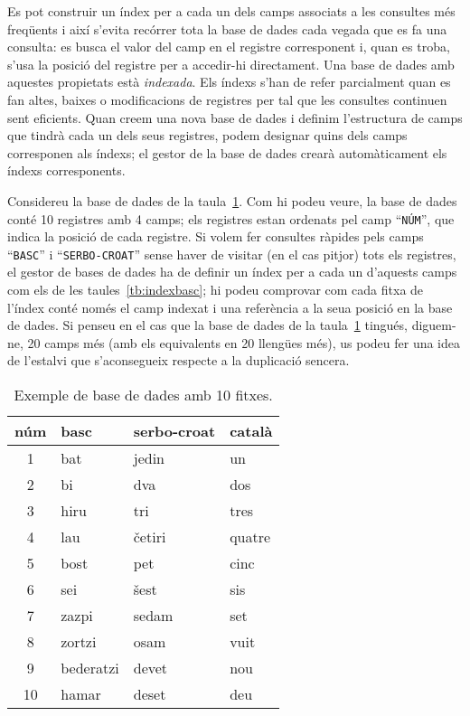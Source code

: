 Es pot construir un índex per a cada un dels camps associats a les
consultes més freqüents i així s'evita recórrer tota la base de dades
cada vegada que es fa una consulta: es busca el valor del camp en el
registre corresponent i, quan es troba, s'usa la posició del registre
per a accedir-hi directament. Una base de dades amb aquestes
propietats està \emph{indexada}. 
Els índexs s'han de
refer parcialment quan es fan altes, baixes o modificacions de registres per tal que les
consultes continuen sent eficients. Quan creem una nova base de dades i definim
l'estructura de camps que tindrà cada un dels seus registres, podem
designar quins dels camps corresponen als índexs; el gestor de la base
de dades crearà automàticament els índexs corresponents.


  Considereu la base de dades de la taula~\ref{tb:indextot}. Com hi
  podeu veure, la base de dades conté 10 registres amb 4 camps; els
  registres estan ordenats pel camp ``\texttt{NÚM}'', que indica la
  posició de cada registre. Si volem fer consultes ràpides pels camps
  ``\texttt{BASC}'' i ``\texttt{SERBO-CROAT}'' sense haver de visitar
  (en el cas pitjor) tots els registres, el gestor de bases de dades
  ha de definir un índex per a cada un d'aquests camps com els de les
  taules~\ref{tb:indexbasc}; hi podeu comprovar com cada fitxa de
  l'índex conté només el camp indexat i una referència a la seua
  posició en la base de dades. Si penseu en el cas que la base de
  dades de la taula~\ref{tb:indextot} tingués, diguem-ne, 20 camps més
  (amb els equivalents en 20 llengües més), us podeu fer una idea de
  l'estalvi que s'aconsegueix respecte a la duplicació sencera.

 \begin{table}
 \begin{center}
 \begin{tabular}{clll}
 \hline
 {\sc núm} & {\sc basc} & {\sc serbo-croat} & {\sc català} \\
 \hline 
 \hline
  1 & bat  &     jedin &       un \\
  2 & bi   &     dva   &       dos \\
  3 & hiru &     tri   &       tres \\
  4 & lau  &     \v{c}etiri &      quatre \\
  5 & bost &     pet    &      cinc \\
  6 & sei  &     \v{s}est   &      sis \\
  7 & zazpi &    sedam  &      set \\
  8 & zortzi &   osam   &      vuit \\
  9 & bederatzi & devet &       nou \\
 10 & hamar &    deset  &      deu \\
 \hline
 \end{tabular}
 \caption{Exemple de base de dades amb 10 fitxes.}
 \label{tb:indextot}
 \end{center}
 \end{table}


